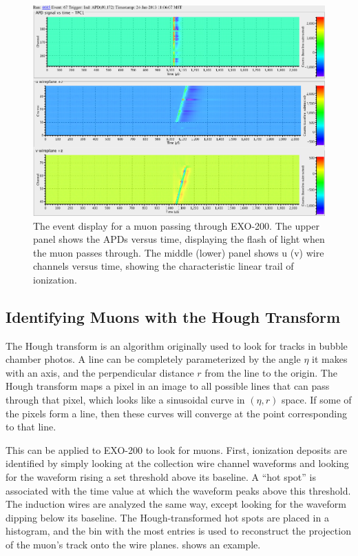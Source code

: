 \documentclass[herrin-thesis.tex]{subfiles}
\begin{document}
\begin{figure}[htbp]
\centering
\includegraphics[width=1\columnwidth]{./plots/muon_eventdisplay_run_4685_ev_67.png}
\caption[A muon passing through EXO-200]{The event display for a muon passing through EXO-200. The upper panel shows the APDs versus time, displaying the flash of light when the muon passes through. The middle (lower) panel shows u (v) wire channels versus time, showing the characteristic linear trail of ionization.}
\label{fig:muon:eventdisplay}
\end{figure}

\subsection{Identifying Muons with the Hough Transform}
The Hough transform\cite{Hough:1959fk}\cite{Duda:1972:UHT:361237.361242} is an algorithm originally used to look for tracks in bubble chamber photos. A line can be completely parameterized by the angle \(\eta\) it makes with an axis, and the perpendicular distance \(r\) from the line to the origin. The Hough transform maps a pixel in an image to all possible lines that can pass through that pixel, which looks like a sinusoidal curve in \((\eta, r)\) space. If some of the pixels form a line, then these curves will converge at the point corresponding to that line.

This can be applied to EXO-200 to look for muons. First, ionization deposits are identified by simply looking at the collection wire channel waveforms and looking for the waveform rising a set threshold above its baseline. A ``hot spot'' is associated with the time value at which the waveform peaks above this threshold. The induction wires are analyzed the same way, except looking for the waveform dipping below its baseline. The Hough-transformed hot spots are placed in a histogram, and the bin with the most entries is used to reconstruct the projection of the muon's track onto the wire planes.  shows an example.
\end{document}
